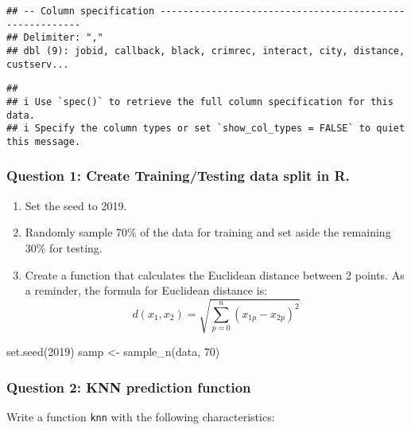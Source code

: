\documentclass[
]{article}
\newenvironment{Shaded}{\begin{snugshade}}{\end{snugshade}}
\newcommand{\DecValTok}[1]{\textcolor[rgb]{0.00,0.00,0.81}{#1}}
\newcommand{\FunctionTok}[1]{\textcolor[rgb]{0.00,0.00,0.00}{#1}}
\newcommand{\NormalTok}[1]{#1}
\newcommand{\OtherTok}[1]{\textcolor[rgb]{0.56,0.35,0.01}{#1}}
\begin{document}
\begin{verbatim}
## -- Column specification --------------------------------------------------------
## Delimiter: ","
## dbl (9): jobid, callback, black, crimrec, interact, city, distance, custserv...
\end{verbatim}

\begin{verbatim}
## 
## i Use `spec()` to retrieve the full column specification for this data.
## i Specify the column types or set `show_col_types = FALSE` to quiet this message.
\end{verbatim}

\hypertarget{question-1-create-trainingtesting-data-split-in-r.}{%
\subsubsection{Question 1: Create Training/Testing data split in
R.}\label{question-1-create-trainingtesting-data-split-in-r.}}

\begin{enumerate}
\item Set the seed to 2019.
\item Randomly sample 70\% of the data for training and set aside the remaining 30\% for testing.
\item Create a function that calculates the Euclidean distance between 2 points. As a reminder, the formula for Euclidean distance is:
\begin{equation}
d(x_{1},x_{2})=\sqrt{\sum_{p=0}^n (x_{1p}-x_{2p})^2}
\end{equation}
\end{enumerate}

\begin{Shaded}
\begin{Highlighting}[]
\FunctionTok{set.seed}\NormalTok{(}\DecValTok{2019}\NormalTok{)}
\NormalTok{samp }\OtherTok{\textless{}{-}} \FunctionTok{sample\_n}\NormalTok{(data, }\DecValTok{70}\NormalTok{)}
\end{Highlighting}
\end{Shaded}

\hypertarget{question-2-knn-prediction-function}{%
\subsubsection{Question 2: KNN prediction
function}\label{question-2-knn-prediction-function}}

Write a function \texttt{knn} with the following characteristics:
\end{document}
